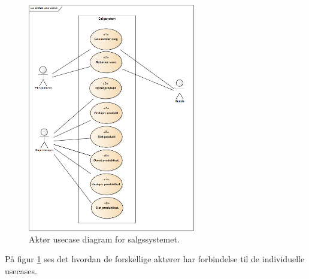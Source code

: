 \begin{figure}[htb]
    \centering
    \includegraphics[width=0.65\textwidth]{Kravspecifikation/Billeder/AktorUC.PNG}
    \caption{Aktør usecase diagram for salgssystemet.}
    \label{fig:aktcont}
\end{figure}

På figur \ref{fig:aktcont} ses det hvordan de forskellige aktører har forbindelse til de individuelle usecases.